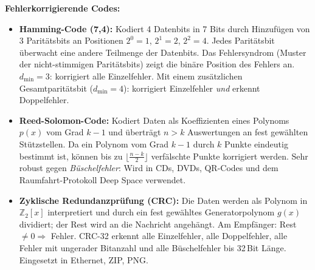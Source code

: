 


\textbf{Fehlerkorrigierende Codes:}
\begin{itemize}[leftmargin=1.5em]
    \item \textbf{Hamming-Code (7,4):} Kodiert 4 Datenbits in 7 Bits durch Hinzufügen von 3 Paritätsbits an Positionen $2^0=1$, $2^1=2$, $2^2=4$. Jedes Paritätsbit überwacht eine andere Teilmenge der Datenbits. Das Fehlersyndrom (Muster der nicht-stimmigen Paritätsbits) zeigt die binäre Position des Fehlers an. $d_{\min} = 3$: korrigiert alle Einzelfehler. Mit einem zusätzlichen Gesamtparitätsbit ($d_{\min} = 4$): korrigiert Einzelfehler \emph{und} erkennt Doppelfehler.

    \item \textbf{Reed-Solomon-Code:} Kodiert Daten als Koeffizienten eines Polynoms $p(x)$ vom Grad $k-1$ und überträgt $n > k$ Auswertungen an fest gewählten Stützstellen. Da ein Polynom vom Grad $k-1$ durch $k$ Punkte eindeutig bestimmt ist, können bis zu $\lfloor\frac{n-k}{2}\rfloor$ verfälschte Punkte korrigiert werden. Sehr robust gegen \emph{Büschelfehler}: Wird in CDs, DVDs, QR-Codes und dem Raumfahrt-Protokoll Deep Space verwendet.

    \item \textbf{Zyklische Redundanzprüfung (CRC):} Die Daten werden als Polynom in $\mathbb{Z}_2[x]$ interpretiert und durch ein fest gewähltes Generatorpolynom $g(x)$ dividiert; der Rest wird an die Nachricht angehängt. Am Empfänger: Rest $\neq 0 \Rightarrow$ Fehler. CRC-32 erkennt alle Einzelfehler, alle Doppelfehler, alle Fehler mit ungerader Bitanzahl und alle Büschelfehler bis 32\,Bit Länge. Eingesetzt in Ethernet, ZIP, PNG.
\end{itemize}

